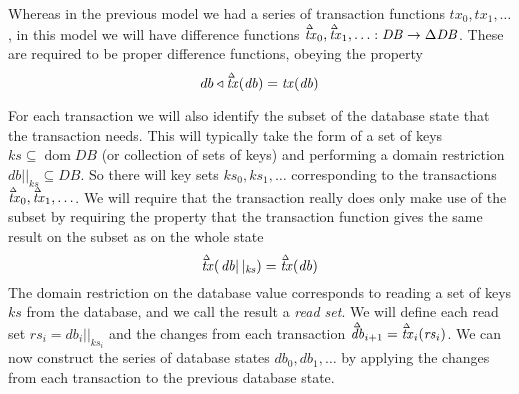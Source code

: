 \documentclass[11pt,a4paper]{article}
\DeclareMathOperator{\dom}{dom}
\newcommand\restrict[2]{\left.#1\right||_{#2}}
\newcommand\deltavar[1]{\accentset{\Delta}{#1}}
\begin{document}
Whereas in the previous model we had a series of transaction functions
$\mathit{tx}_0, \mathit{tx}_1, \ldots$, in this model we will have difference
functions
$\deltavar{\mathit{tx}}_0, \deltavar{\mathit{tx}}_1, \ldots : \mathit{DB} \to \Delta\mathit{DB}$. These are required to be proper difference functions, obeying the property
\begin{equation}
\label{eq:diff-fun}
db \triangleleft \deltavar{\mathit{tx}}(\mathit{db}) = \mathit{tx}(\mathit{db})
\end{equation}

For each transaction we will also identify the subset of the database state that
the transaction needs. This will typically take the form of a set of keys
$\mathit{ks} \subseteq \dom{\mathit{DB}}$ (or collection of sets of keys) and
performing a domain restriction $\restrict{\mathit{db}}{\mathit{ks}} \subseteq \mathit{DB}$.
So there will key sets $\mathit{ks}_0, \mathit{ks}_1, \ldots$ corresponding to
the transactions $\deltavar{\mathit{tx}}_0, \deltavar{\mathit{tx}}_1, \ldots$.
We will require that the transaction really does only make use of the subset
by requiring the property that the transaction function gives the same result
on the subset as on the whole state
\begin{equation}
\label{eq:tx-within-keyset}
  \deltavar{\mathit{tx}}(\restrict{\mathit{db}}{\mathit{ks}}) = \deltavar{\mathit{tx}}(\mathit{db})
\end{equation}
The domain restriction on the database value corresponds to reading a set of
keys $\mathit{ks}$ from the database, and we call the result a \emph{read set}.
We will define each read set
$\mathit{rs}_i = \restrict{\mathit{db}_i}{\mathit{ks}_i}$
and the changes from each transaction
$\deltavar{\mathit{db}}_{i+1} = \deltavar{\mathit{tx}}_i(\mathit{rs}_i)$.
We can now construct the series of database states
$\mathit{db}_0, \mathit{db}_1, \ldots$ by applying the changes from each
transaction to the previous database state.
\end{document}
